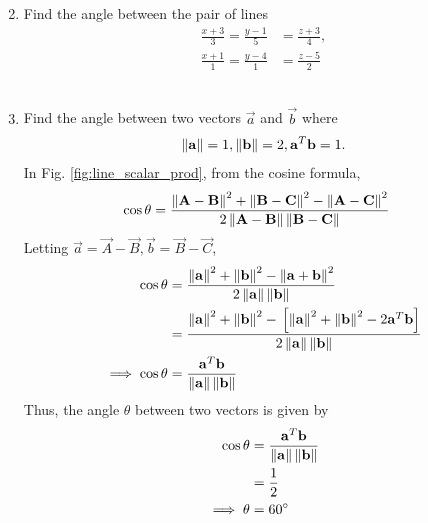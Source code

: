 \documentclass[journal,12pt,twocolumn]{IEEEtran}
\renewcommand\thesection{\arabic{section}}
\begin{document}
\begin{enumerate}[label=\thesection.\arabic*.,ref=\thesection.\theenumi]
\begin{align}
\end{align}
%
\\
\solution 
%
\item Find the angle between the pair of lines
\begin{align}
\frac{x+3}{3} = \frac{y-1}{5} &= \frac{z+3}{4}, 
\\
\frac{x+1}{1} = \frac{y-4}{1} &= \frac{z-5}{2} 
\end{align}
%
\\
\solution 
%
%
\item Find the angle between two vectors $\vec{a}$ and $\vec{b}$ where 
%
\begin{align}
\left\lVert\mathbf{a}\right\rVert = 1,
\left\lVert\mathbf{b}\right\rVert = 2,
\mathbf{a}^T\mathbf{b} = 1.
\end{align}
%
\solution In Fig. \ref{fig:line_scalar_prod}, from the cosine formula, 
%
\begin{align}
\cos \theta &= \frac{\left\lVert\mathbf{A}-\mathbf{B}\right\rVert^2+\left\lVert\mathbf{B}-\mathbf{C}\right\rVert^2-\left\lVert\mathbf{A}-\mathbf{C}\right\rVert^2}{2\left\lVert\mathbf{A}-\mathbf{B}\right\rVert\left\lVert\mathbf{B}-\mathbf{C}\right\rVert}
\end{align}
Letting $\vec{a} = \vec{A}-\vec{B}, \vec{b} = \vec{B}-\vec{C}$, 
\begin{align}
\cos \theta &= \frac{\left\lVert\mathbf{a}\right\rVert^2+\left\lVert\mathbf{b}\right\rVert^2-\left\lVert\mathbf{a}+\mathbf{b}\right\rVert^2}{2\left\lVert\mathbf{a}\right\rVert\left\lVert\mathbf{b}\right\rVert}
\\
&= \frac{\left\lVert\mathbf{a}\right\rVert^2+\left\lVert\mathbf{b}\right\rVert^2-{}\left[\left\lVert\mathbf{a}\right\rVert^2+\left\lVert\mathbf{b}\right\rVert^2-2\mathbf{a}^T\mathbf{b}\right]}{2\left\lVert\mathbf{a}\right\rVert\left\lVert\mathbf{b}\right\rVert}
\\
\implies \cos \theta &=\frac{\mathbf{a}^T\mathbf{b}}{\left\lVert\mathbf{a}\right\rVert\left\lVert\mathbf{b}\right\rVert}
\end{align}
%
Thus, the angle $\theta$ between two vectors is given by 
%
\begin{align}
\label{eq:line_scalar_prod}
\cos \theta &= \frac{\mathbf{a}^T\mathbf{b}}{\left\lVert\mathbf{a}\right\rVert\left\lVert\mathbf{b}\right\rVert}
\\
&=\frac{1}{2}
\\
\implies \theta &= 60\degree
\end{align}
%
%



\end{enumerate}
\end{document}
